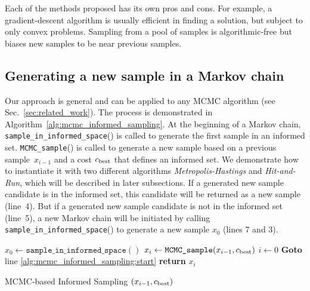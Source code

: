 \documentclass[letterpaper, 10 pt, conference]{ieeeconf}  %
\begin{document}
Each of the methods proposed has its own pros and cons.
For example, a gradient-descent algorithm is usually efficient in finding a solution, but subject to only convex problems.
Sampling from a pool of samples is algorithmic-free but biases new samples to be near previous samples.


\subsection{Generating a new sample in a Markov chain}
\label{mcmc}

Our approach is general and can be applied to any MCMC algorithm (see Sec.~\ref{sec:related_work}).
The process is demonstrated in Algorithm~\ref{alg:mcmc_informed_sampling}.
At the beginning of a Markov chain, \texttt{sample\_in\_informed\_space}() is called to generate the first sample in an informed set.
\texttt{MCMC\_sample}() is called to generate a new sample based on a previous sample~$ x_{i-1} $ and a cost $ c_{\rm best} $ that defines an informed set.
We demonstrate how to instantiate it with two different algorithms \emph{Metropolis-Hastings} and \emph{Hit-and-Run}, which will be described in later subsections.
If a generated new sample candidate is in the informed set, this candidate will be returned as a new sample (line~4).
But if a generated new sample candidate is not in the informed set (line~5), a new Markov chain will be initiated by calling \texttt{sample\_in\_informed\_space}() to generate a new sample $ x_0 $ (lines 7 and 3).

\begin{algorithm}[t]
	\begin{algorithmic}[1]
		\LOOP 
		\label{alg:mcmc_informed_sampling:start}
			\STATE $x_{0} \leftarrow \texttt{sample\_in\_informed\_space}( )$
		\ENDIF
		\STATE $x_{i} \leftarrow \texttt{MCMC\_sample} (x_{i-1}, c_{\rm best})$ 
			\STATE $ i \leftarrow 0$
			\STATE \textbf{Goto} line \ref{alg:mcmc_informed_sampling:start} 
		\ENDIF
		\STATE \textbf{return} $x_{i}$
		\ENDLOOP 
	\end{algorithmic}
	\caption{\captionstyle MCMC-based Informed Sampling $( x_{i-1}, c_{\rm best})$}
	\label{alg:mcmc_informed_sampling}	
\end{algorithm}
\end{document}
